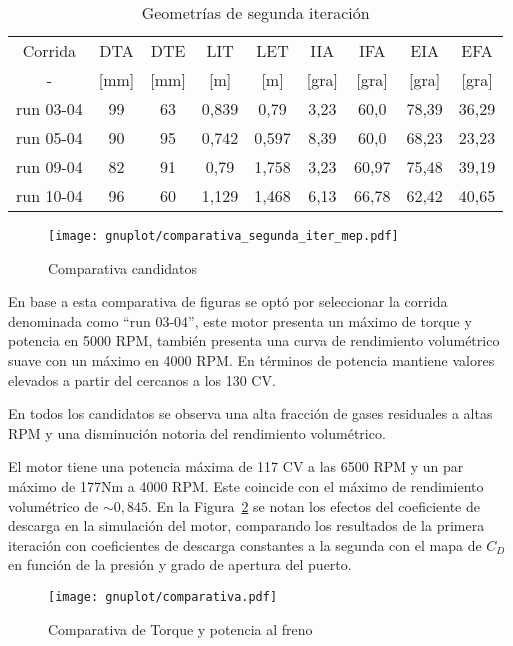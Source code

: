 \begin{table}[h!]
  \centering
  \begin{tabular}{ccccccccc}\toprule
    Corrida   & DTA   & DTE & LIT   & LET   & IIA   & IFA   & EIA    & EFA \\
    -         & [mm] & [mm] & [m]   & [m]   & [gra] & [gra] & [gra]  & [gra] \\ \midrule
    run 03-04 & 99   & 63   & 0,839 & 0,79  & 3,23 & 60,0   & 78,39  & 36,29 \\
    run 05-04 & 90   & 95   & 0,742 & 0,597 & 8,39 & 60,0   & 68,23  & 23,23 \\
    run 09-04 & 82   & 91   & 0,79  & 1,758 & 3,23 & 60,97  & 75,48  & 39,19 \\
    run 10-04 & 96   & 60   & 1,129 & 1,468 & 6,13 & 66,78  & 62,42  & 40,65 \\ \bottomrule
  \end{tabular}
  \caption{Geometrías de segunda iteración}\label{tab:2iter_geom}
\end{table}

\begin{figure}[h!] \centering
\texttt{[image: gnuplot/comparativa\_segunda\_iter\_mep.pdf]}
  \caption{Comparativa candidatos} \label{fig:comparativa_segunda_iter}
\end{figure}

En base a esta comparativa de figuras se optó por seleccionar la corrida
denominada como ``run 03-04'', este motor presenta un máximo de torque y potencia
en 5000 RPM, también presenta una curva de rendimiento volumétrico suave con un
máximo en 4000 RPM.
%
En términos de potencia mantiene valores elevados a partir del cercanos a los
130 CV.
%

En todos los candidatos se observa una alta fracción de gases residuales a altas
RPM y una disminución notoria del rendimiento volumétrico.

El motor tiene una potencia máxima de 117 CV a las 6500 RPM y un par máximo de
177Nm a 4000 RPM.
%
Este coincide con el máximo de rendimiento volumétrico de $\sim 0,845$.
%
En la Figura~\ref{fig:PoTi_segunda_op} se notan los efectos del coeficiente de
descarga en la simulación del motor, comparando los resultados de la primera
iteración con coeficientes de descarga constantes a la segunda con el mapa de
$C_{D}$ en función de la presión y grado de apertura del puerto.

\begin{figure}[h!]
  \centering
  \texttt{[image: gnuplot/comparativa.pdf]}
  \caption{Comparativa de Torque y potencia al freno} \label{fig:PoTi_segunda_op}
\end{figure}
